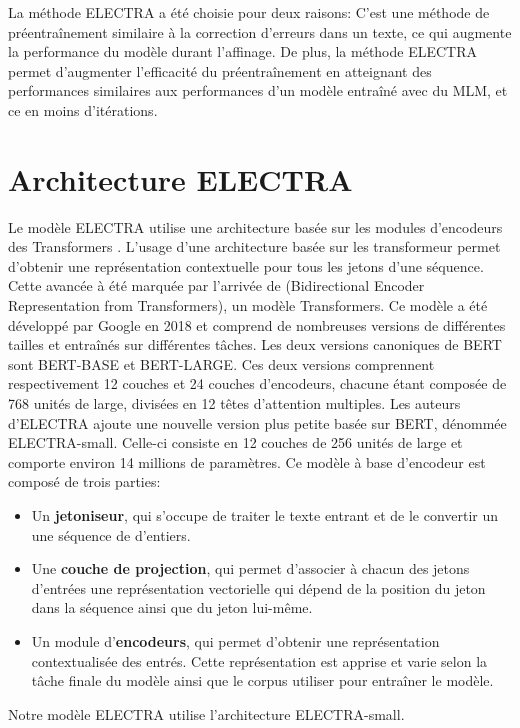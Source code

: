 \documentclass[12pt,twoside,maitrise]{dms}
\theoremstyle{definition}
\numberwithin{equation}{section}
\numberwithin{table}{chapter}
\numberwithin{figure}{chapter}
\begin{document}
La méthode ELECTRA a été choisie pour deux raisons: C'est une méthode de
préentraînement similaire à la correction d'erreurs dans un texte, ce qui
augmente la performance du modèle durant l'affinage. De plus, la méthode
ELECTRA permet d'augmenter l'efficacité du préentraînement en atteignant des
performances similaires aux performances d'un modèle entraîné avec du MLM, et
ce en moins d'itérations.


\section{Architecture ELECTRA}
Le modèle ELECTRA utilise une architecture basée sur les modules d'encodeurs
des Transformers \cite{vaswani2023attentionneed}. L'usage d'une architecture
basée sur les transformeur permet d'obtenir une représentation contextuelle
pour tous les jetons d'une séquence. Cette avancée à été marquée par l'arrivée
de \cite{bert} (Bidirectional Encoder Representation from Transformers), un
modèle Transformers. Ce modèle a été développé par Google en 2018 et comprend
de nombreuses versions de différentes tailles et entraînés sur différentes
tâches. Les deux versions canoniques de BERT sont BERT-BASE et BERT-LARGE. Ces
deux versions comprennent respectivement 12 couches et 24 couches d'encodeurs,
chacune étant composée de 768 unités de large, divisées en 12 têtes d’attention
multiples. Les auteurs d'ELECTRA ajoute une nouvelle version plus petite basée
sur BERT, dénommée ELECTRA-small. Celle-ci consiste en 12 couches de 256 unités
de large et comporte environ 14 millions de paramètres. Ce modèle à base
d'encodeur est composé de trois parties:
\begin{itemize}
	\item Un \textbf{jetoniseur}, qui s'occupe de traiter le texte entrant et
	      de le convertir un une séquence de d'entiers.
	\item Une \textbf{couche de projection}, qui permet d'associer à chacun des
	      jetons d'entrées une représentation vectorielle qui dépend de la
	      position du jeton dans la séquence ainsi que du jeton lui-même.
	\item Un module d'\textbf{encodeurs}, qui permet d'obtenir une
	      représentation contextualisée des entrés. Cette représentation est
	      apprise et varie selon la tâche finale du modèle ainsi que le corpus
	      utiliser pour entraîner le modèle.
\end{itemize}
Notre modèle ELECTRA utilise l'architecture ELECTRA-small.
\end{document}

